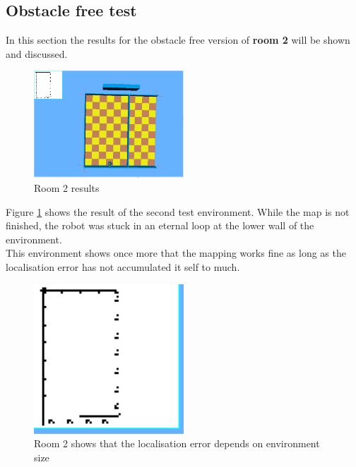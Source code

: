 \subsection{Obstacle free test}
In this section the results for the obstacle free version of \textbf{room 2} will be shown and discussed. \\[3ex]

\begin{figure}[h]
\centering
\includegraphics[width = 0.5\textwidth]{../../figures/map_results/save_corner_with_odometry_error.png}
\caption{Room 2 results}
\label{room2_results}
\end{figure}

Figure \ref{room2_results} shows the result of the second test environment.
While the map is not finished, the robot was stuck in an eternal loop at the lower wall of the environment.\\
This environment shows once more that the mapping works fine as long as the localisation error has not accumulated it self to much. \\

\begin{figure}[h]
\centering
\includegraphics[width = 0.5\textwidth]{../../figures/map_results/minimum_localisation_error.png}
\caption{Room 2 shows that the localisation error depends on environment size}
\label{room2_error}
\end{figure}

